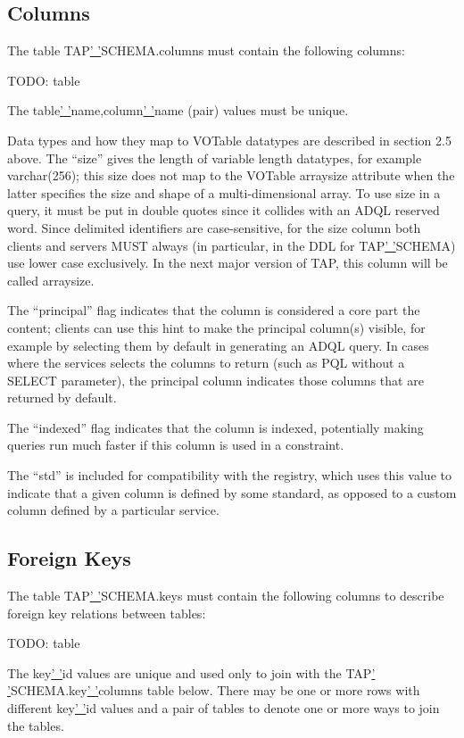 \documentclass[11pt,a4paper]{ivoa}
\begin{document}
{\subsection{Columns}
The table TAP\underline{' '}SCHEMA.columns must contain the following columns:

TODO: table

The table\underline{' '}name,column\underline{' '}name (pair) values must be 
unique.

Data types and how they map to VOTable datatypes are described in section 2.5 
above. The “size” gives the length of variable length datatypes, for example 
varchar(256); this size does not map to the VOTable arraysize attribute when the 
latter specifies the size and shape of a multi-dimensional array. To use size in 
a query, it must be put in double quotes since it collides with an ADQL reserved 
word. Since delimited identifiers are case-sensitive, for the size column both 
clients and servers MUST always (in particular, in the DDL for 
TAP\underline{' '}SCHEMA) use lower case exclusively. In the next major version 
of TAP, this column will be called arraysize.

The “principal” flag indicates that the column is considered a core part the 
content; clients can use this hint to make the principal column(s) visible, for 
example by selecting them by default in generating an ADQL query. In cases where 
the services selects the columns to return (such as PQL without a SELECT 
parameter), the principal column indicates those columns that are returned by 
default. 

The “indexed” flag indicates that the column is indexed, potentially 
making queries run much faster if this column is used in a constraint. 

The “std” is included for compatibility with the registry, which uses this value 
to indicate that a given column is defined by some standard, as opposed to a 
custom column defined by a particular service.

\subsection{Foreign Keys}
The table TAP\underline{' '}SCHEMA.keys must contain the following columns to 
describe foreign key relations between tables:

TODO: table

The key\underline{' '}id values are unique and used only to join with the 
TAP\underline{' '}SCHEMA.key\underline{' '}columns table below. There may be 
one or more rows with different key\underline{' '}id values and a pair 
of tables to denote one or more ways to join the tables.

}
\end{document}
